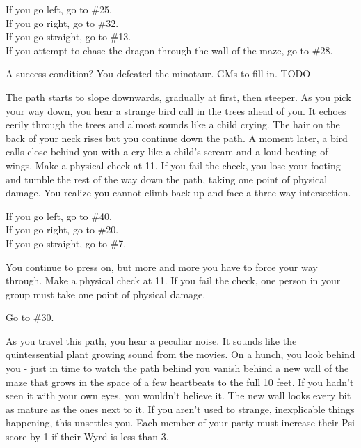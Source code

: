 \documentclass[green]{gl2018}
\begin{document}
\begin{large}
\begin{location}{15}
\begin{fromhere}
   If you go left, go to \#25.\\
 If you go right, go to \#32.\\ 
If you go straight, go to \#13.\\
If you attempt to chase the dragon through the wall of the maze, go to \#28.
\end{fromhere}
\end{location}
\begin{location}{16}
A success condition?  You defeated the minotaur.  GMs to fill in. TODO
\end{location}
\begin{location}{17}
The path starts to slope downwards, gradually at first, then steeper.  As you pick your way down, you hear a strange bird call in the trees ahead of you.  It echoes eerily through the trees and almost sounds like a child crying.  The hair on the back of your neck rises but you continue down the path.  A moment later, a bird calls close behind you with a cry like a child’s scream and a loud beating of wings.  Make a physical check at 11.  If you fail the check, you lose your footing and tumble the rest of the way down the path, taking one point of physical damage.  You realize you cannot climb back up and face a three-way intersection.  
\begin{fromhere}
If you go left, go to \#40.\\
  If you go right, go to \#20.\\
  If you go straight, go to \#7.\\
\end{fromhere}
\end{location}
\begin{location}{18}
You continue to press on, but more and more you have to force your way through. Make a physical check at 11. If you fail the check, one person in your group must take one point of physical damage. 
\begin{fromhere}Go to \#30.\end{fromhere}
\end{location}
\begin{location}{19}
As you travel this path, you hear a peculiar noise. It sounds like the quintessential plant growing sound from the movies. On a hunch, you look behind you - just in time to watch the path behind you vanish behind a new wall of the maze that grows in the space of a few heartbeats to the full 10 feet. If you hadn't seen it with your own eyes, you wouldn't believe it. The new wall looks every bit as mature as the ones next to it. If you aren't used to strange, inexplicable things happening, this unsettles you.  Each member of your party must increase their Psi score by 1 if their Wyrd is less than 3.

\end{location}
\end{large}
\end{document}
